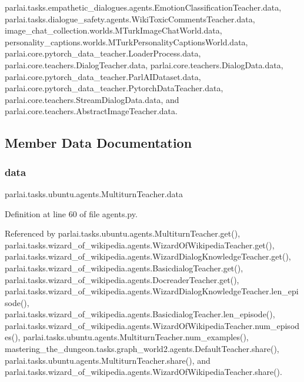 parlai.\+tasks.\+empathetic\+\_\+dialogues.\+agents.\+Emotion\+Classification\+Teacher.\+data, parlai.\+tasks.\+dialogue\+\_\+safety.\+agents.\+Wiki\+Toxic\+Comments\+Teacher.\+data, image\+\_\+chat\+\_\+collection.\+worlds.\+M\+Turk\+Image\+Chat\+World.\+data, personality\+\_\+captions.\+worlds.\+M\+Turk\+Personality\+Captions\+World.\+data, parlai.\+core.\+pytorch\+\_\+data\+\_\+teacher.\+Loader\+Process.\+data, parlai.\+core.\+teachers.\+Dialog\+Teacher.\+data, parlai.\+core.\+teachers.\+Dialog\+Data.\+data, parlai.\+core.\+pytorch\+\_\+data\+\_\+teacher.\+Parl\+A\+I\+Dataset.\+data, parlai.\+core.\+pytorch\+\_\+data\+\_\+teacher.\+Pytorch\+Data\+Teacher.\+data, parlai.\+core.\+teachers.\+Stream\+Dialog\+Data.\+data, and parlai.\+core.\+teachers.\+Abstract\+Image\+Teacher.\+data.



\subsection{Member Data Documentation}
\mbox{\label{classparlai_1_1tasks_1_1ubuntu_1_1agents_1_1MultiturnTeacher_a0746041b61b1174f04efa5e19c6ec55d}} 
\subsubsection{\texorpdfstring{data}{data}}
{\footnotesize\ttfamily parlai.\+tasks.\+ubuntu.\+agents.\+Multiturn\+Teacher.\+data}



Definition at line 60 of file agents.\+py.



Referenced by parlai.\+tasks.\+ubuntu.\+agents.\+Multiturn\+Teacher.\+get(), parlai.\+tasks.\+wizard\+\_\+of\+\_\+wikipedia.\+agents.\+Wizard\+Of\+Wikipedia\+Teacher.\+get(), parlai.\+tasks.\+wizard\+\_\+of\+\_\+wikipedia.\+agents.\+Wizard\+Dialog\+Knowledge\+Teacher.\+get(), parlai.\+tasks.\+wizard\+\_\+of\+\_\+wikipedia.\+agents.\+Basicdialog\+Teacher.\+get(), parlai.\+tasks.\+wizard\+\_\+of\+\_\+wikipedia.\+agents.\+Docreader\+Teacher.\+get(), parlai.\+tasks.\+wizard\+\_\+of\+\_\+wikipedia.\+agents.\+Wizard\+Dialog\+Knowledge\+Teacher.\+len\+\_\+episode(), parlai.\+tasks.\+wizard\+\_\+of\+\_\+wikipedia.\+agents.\+Basicdialog\+Teacher.\+len\+\_\+episode(), parlai.\+tasks.\+wizard\+\_\+of\+\_\+wikipedia.\+agents.\+Wizard\+Of\+Wikipedia\+Teacher.\+num\+\_\+episodes(), parlai.\+tasks.\+ubuntu.\+agents.\+Multiturn\+Teacher.\+num\+\_\+examples(), mastering\+\_\+the\+\_\+dungeon.\+tasks.\+graph\+\_\+world2.\+agents.\+Default\+Teacher.\+share(), parlai.\+tasks.\+ubuntu.\+agents.\+Multiturn\+Teacher.\+share(), and parlai.\+tasks.\+wizard\+\_\+of\+\_\+wikipedia.\+agents.\+Wizard\+Of\+Wikipedia\+Teacher.\+share().

